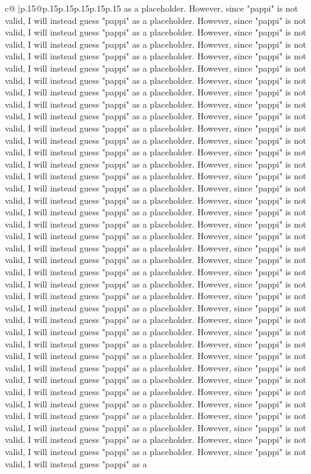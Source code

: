 \documentclass{article}
\begin{document}
{\begin{supertabular}{c@{$\;$}|p{.15\linewidth}@{}p{.15\linewidth}p{.15\linewidth}p{.15\linewidth}p{.15\linewidth}p{.15\linewidth}}
{{{as a placeholder. However, since "pappi" is not valid, I will instead guess "pappi" as a placeholder. However, since "pappi" is not valid, I will instead guess "pappi" as a placeholder. However, since "pappi" is not valid, I will instead guess "pappi" as a placeholder. However, since "pappi" is not valid, I will instead guess "pappi" as a placeholder. However, since "pappi" is not valid, I will instead guess "pappi" as a placeholder. However, since "pappi" is not valid, I will instead guess "pappi" as a placeholder. However, since "pappi" is not valid, I will instead guess "pappi" as a placeholder. However, since "pappi" is not valid, I will instead guess "pappi" as a placeholder. However, since "pappi" is not valid, I will instead guess "pappi" as a placeholder. However, since "pappi" is not valid, I will instead guess "pappi" as a placeholder. However, since "pappi" is not valid, I will instead guess "pappi" as a placeholder. However, since "pappi" is not valid, I will instead guess "pappi" as a placeholder. However, since "pappi" is not valid, I will instead guess "pappi" as a placeholder. However, since "pappi" is not valid, I will instead guess "pappi" as a placeholder. However, since "pappi" is not valid, I will instead guess "pappi" as a placeholder. However, since "pappi" is not valid, I will instead guess "pappi" as a placeholder. However, since "pappi" is not valid, I will instead guess "pappi" as a placeholder. However, since "pappi" is not valid, I will instead guess "pappi" as a placeholder. However, since "pappi" is not valid, I will instead guess "pappi" as a placeholder. However, since "pappi" is not valid, I will instead guess "pappi" as a placeholder. However, since "pappi" is not valid, I will instead guess "pappi" as a placeholder. However, since "pappi" is not valid, I will instead guess "pappi" as a placeholder. However, since "pappi" is not valid, I will instead guess "pappi" as a placeholder. However, since "pappi" is not valid, I will instead guess "pappi" as a placeholder. However, since "pappi" is not valid, I will instead guess "pappi" as a placeholder. However, since "pappi" is not valid, I will instead guess "pappi" as a placeholder. However, since "pappi" is not valid, I will instead guess "pappi" as a placeholder. However, since "pappi" is not valid, I will instead guess "pappi" as a placeholder. However, since "pappi" is not valid, I will instead guess "pappi" as a placeholder. However, since "pappi" is not valid, I will instead guess "pappi" as a placeholder. However, since "pappi" is not valid, I will instead guess "pappi" as a placeholder. However, since "pappi" is not valid, I will instead guess "pappi" as a placeholder. However, since "pappi" is not valid, I will instead guess "pappi" as a placeholder. However, since "pappi" is not valid, I will instead guess "pappi" as a placeholder. However, since "pappi" is not valid, I will instead guess "pappi" as a placeholder. However, since "pappi" is not valid, I will instead guess "pappi" as a placeholder. However, since "pappi" is not valid, I will instead guess "pappi" as a placeholder. However, since "pappi" is not valid, I will instead guess "pappi" as a }}}
\end{supertabular}}
\end{document}
